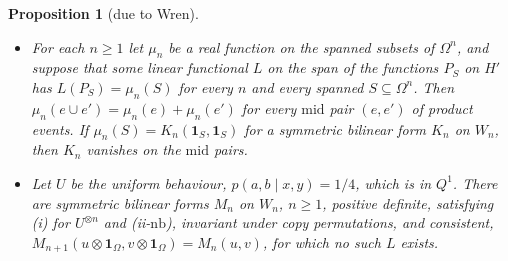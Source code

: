 \documentclass[11pt,a4paper]{article}
\newtheorem{proposition}[theorem]{Proposition}
\theoremstyle{definition}
\theoremstyle{remark}
\newcommand{\ind}[1]{\mathbf{1}_{#1}}
\newcommand{\nb}{\mathrm{nb}}
\newcommand{\md}{\mathrm{mid}}
\begin{document}
\begin{proposition}[due to Wren]\label{p:stop}\leavevmode
\begin{itemize}
  \item[(a)] For each $n \ge 1$ let $\mu_n$ be a real function on the spanned subsets of $\Omega^n$, and suppose that some linear functional $L$ on the span of the functions $P_S$ on $H'$ has $L(P_S) = \mu_n(S)$ for every $n$ and every spanned $S \subseteq \Omega^n$. Then $\mu_n(e \cup e') = \mu_n(e) + \mu_n(e')$ for every $\md$ pair $(e, e')$ of product events. If $\mu_n(S) = K_n(\ind{S}, \ind{S})$ for a symmetric bilinear form $K_n$ on $W_n$, then $K_n$ vanishes on the $\md$ pairs.
  \item[(b)] Let $U$ be the uniform behaviour, $p(a, b \mid x, y) = 1/4$, which is in $Q^1$. There are symmetric bilinear forms $M_n$ on $W_n$, $n \ge 1$, positive definite, satisfying (i) for $U^{\otimes n}$ and (ii-$\nb$), invariant under copy permutations, and consistent, $M_{n+1}(u \otimes \ind{\Omega}, v \otimes \ind{\Omega}) = M_n(u, v)$, for which no such $L$ exists.
\end{itemize}
\end{proposition}
\end{document}
